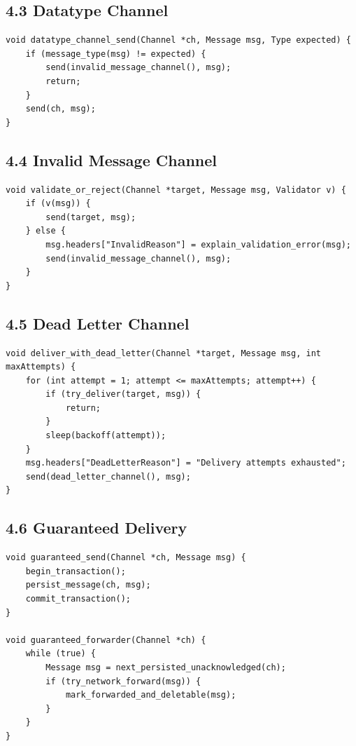 \documentclass[11pt]{article}
\begin{document}
\subsection{4.3 Datatype Channel}\label{datatype-channel}

\begin{verbatim}
void datatype_channel_send(Channel *ch, Message msg, Type expected) {
    if (message_type(msg) != expected) {
        send(invalid_message_channel(), msg);
        return;
    }
    send(ch, msg);
}
\end{verbatim}

\subsection{4.4 Invalid Message Channel}\label{invalid-message-channel}

\begin{verbatim}
void validate_or_reject(Channel *target, Message msg, Validator v) {
    if (v(msg)) {
        send(target, msg);
    } else {
        msg.headers["InvalidReason"] = explain_validation_error(msg);
        send(invalid_message_channel(), msg);
    }
}
\end{verbatim}

\subsection{4.5 Dead Letter Channel}\label{dead-letter-channel}

\begin{verbatim}
void deliver_with_dead_letter(Channel *target, Message msg, int maxAttempts) {
    for (int attempt = 1; attempt <= maxAttempts; attempt++) {
        if (try_deliver(target, msg)) {
            return;
        }
        sleep(backoff(attempt));
    }
    msg.headers["DeadLetterReason"] = "Delivery attempts exhausted";
    send(dead_letter_channel(), msg);
}
\end{verbatim}

\subsection{4.6 Guaranteed Delivery}\label{guaranteed-delivery}

\begin{verbatim}
void guaranteed_send(Channel *ch, Message msg) {
    begin_transaction();
    persist_message(ch, msg);
    commit_transaction();
}

void guaranteed_forwarder(Channel *ch) {
    while (true) {
        Message msg = next_persisted_unacknowledged(ch);
        if (try_network_forward(msg)) {
            mark_forwarded_and_deletable(msg);
        }
    }
}
\end{verbatim}
\end{document}
